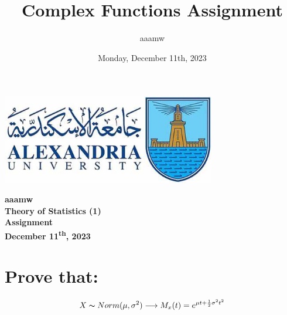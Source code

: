 \documentclass[12pt]{article}
\title{Complex Functions Assignment}
\author{aaamw}
\date{Monday, December 11th, 2023}
\renewcommand{\maketitle}{
\begin{center}
    \Huge\bfseries aaamw \\
	\vspace{5pt}
    \Large\bfseries Theory of Statistics (1) \\
	Assignment \\
    \vspace{0.3em}
	\large December 11\textsuperscript{th}, 2023 \\
\end{center}
}
\begin{document}

\begin{center}
    \includegraphics[width=0.7\textwidth]{uniLogo.jpg}  
\end{center}

\maketitle

\newpage


\section*{Prove that:}
\Large
\[
X \thicksim Norm(\mu, \sigma^2) \longrightarrow	M_x(t) = e^{\mu t +\frac{1}{2} \sigma^2 t^2} 
\]
\end{document}
